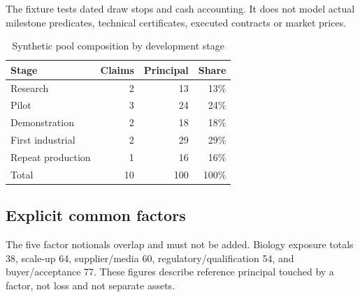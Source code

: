 \documentclass[11pt,a4paper]{article}
\begin{document}
The fixture tests dated draw stops and cash accounting. It does not model actual milestone predicates, technical certificates, executed contracts or market prices.

\begin{table}[htbp]
\centering
\caption{Synthetic pool composition by development stage}
\label{tab:stage}
\begin{tabular}{@{}lrrr@{}}
\toprule
\textbf{Stage} & \textbf{Claims} & \textbf{Principal} & \textbf{Share} \\
\midrule
Research & 2 & 13 & 13\% \\
Pilot & 3 & 24 & 24\% \\
Demonstration & 2 & 18 & 18\% \\
First industrial & 2 & 29 & 29\% \\
Repeat production & 1 & 16 & 16\% \\
\midrule
Total & 10 & 100 & 100\% \\
\bottomrule
\end{tabular}
\end{table}

\subsection{Explicit common factors}

The five factor notionals overlap and must not be added. Biology exposure totals 38, scale-up 64, supplier/media 60, regulatory/qualification 54, and buyer/acceptance 77. These figures describe reference principal touched by a factor, not loss and not separate assets.
\end{document}
